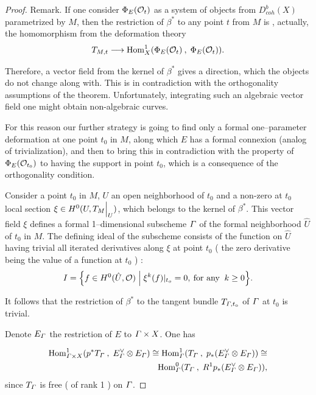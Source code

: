 \documentclass[12pt]{article}
\def\db#1{ D^b_{coh}({#1})}
\def\H#1,#2,#3,#4{{\rm Hom}^{#1}_{#2}({#3}\:,\; {#4})}
\def\lto{\longrightarrow}
\begin{document}
\begin{proof}
{\sc Remark.}
 If one consider $\Phi_E({\cal O}_t)$ as a system of objects from $\db{X}$ parametrized by $M$, then the restriction of $\beta^*$ to any point $t$ from $M$ is , actually, the homomorphism from the deformation theory
$$
T_{M,t}\lto {\H 1, X, {\Phi_E({\cal O}_t)}, {\Phi_E({\cal O}_t)}}.
$$

Therefore, a vector field from the kernel of $\beta^*$ gives a direction, which the objects do not change along with. This is in contradiction with the orthogonality assumptions of the theorem. Unfortunately, integrating such an algebraic vector field one might obtain non-algebraic curves. 
\bigskip

For this reason our further strategy is going to find only a formal one--parameter deformation at one point $t_0$ in $M$, along which $E$ has a formal connexion (analog of trivialization), and then to bring this in contradiction with  the property of $\Phi_E({\cal O}_{t_0})$ to having the support in point $t_0$, which is a consequence of the orthogonality condition.  

Consider a point $t_0$ in $M$, $U$ an open neighborhood of 
$t_0$ and a non-zero at $t_0$ local section $\xi\in H^0(U , T_M\Bigl|_U)$, which belongs to the kernel of $\beta^*$. This vector field $\xi$ defines a formal 1--dimensional subscheme 
$\mit\Gamma$ of the formal neighborhood $\hat U$ of $t_0$
in $M$. The defining ideal of the subscheme consists of the  function on ${\hat U}$ having trivial all iterated derivatives along $\xi$ at point $t_0$ ( the zero derivative being the value of a function at $t_0$ ) :
$$
I=\Bigl\{ f\in H^0(\hat U, {\cal O})\; \Bigl| \;\xi^k(f)|_{t_o}=0, \:\mbox{for any }\: k\ge 0 \Bigl\}.
$$ 

It follows that the restriction of $\beta^*$ to the tangent bundle $T_{\mit\Gamma , t_0}$ of $\mit\Gamma$ at $t_0$ is trivial.

Denote $E_{\mit\Gamma}$ the restriction of $E$ to $\mit\Gamma\times X$. One has

\begin{align}\label{R}
{\H 1, {\mit\Gamma\times X}, {p^*T_{\mit\Gamma} }, {E_{\mit\Gamma}^{\vee}\otimes E_{\mit\Gamma}}}\cong 
{\H 1, {\mit\Gamma}, {T_{\mit\Gamma}} , {p_*(E_{\mit\Gamma}^{\vee}\otimes E_{\mit\Gamma})}}\cong\notag\\
{\H 0 , {\mit\Gamma}, {T_{\mit\Gamma}}, {R^1p_*(E_{\mit\Gamma}^{\vee}\otimes E_{\mit\Gamma})}},
\end{align}
since $T_{\mit\Gamma}$ is free ( of rank 1 ) on ${\mit\Gamma}$.


\end{proof}
\end{document}
